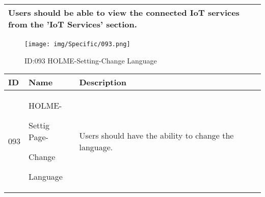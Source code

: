 \documentclass[conference]{IEEEtran}
\begin{document}
\begin{enumerate}
\begin{table}[h]
\begin{tabular}{|p{1cm}|p{1.8cm}|p{5.0cm}|}
       Users should be able to view the connected IoT services from the 'IoT Services' section.
         \\ \hline
    \end{tabular}
\end{table}
\begin{figure}[h]
\centering                                         
\texttt{[image: img/Specific/093.png]}
\caption{ID:093 HOLME-Setting-Change Language}
\end{figure}
\begin{table}[h]
\def\arraystretch{1.2} \small
    \begin{tabular}{|p{1cm}|p{1.8cm}|p{5.0cm}|}
        \hline
        ID & Name & Description\\ \hline
         093 \par  & HOLME-\par Settig Page- \par Change \par Language& 
       	Users should have the ability to change the language.
         \\ \hline
    \end{tabular}
\end{table}
\clearpage


\end{enumerate}
\end{document}
